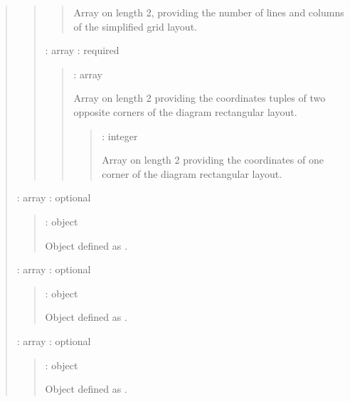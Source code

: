 \documentclass[letterpaper,10pt, openany,english]{sphinxmanual}
\begin{document}
\begin{quote}
\begin{quote}
\begin{quote}
Array on length 2, providing the number of lines and columns of the simplified grid layout.
\end{quote}

 : array : required
\begin{quote}

 : array

Array on length 2 providing the coordinates tuples of two opposite corners of the diagram rectangular layout.
\begin{quote}

 : integer

Array on length 2 providing the coordinates of one corner of the diagram rectangular layout.
\end{quote}
\end{quote}
\end{quote}

 : array : optional
\begin{quote}

 : object

Object defined as {\hyperref[\detokenize{requirements:elementary-object}]{}}.
\end{quote}

 : array : optional
\begin{quote}

 : object

Object defined as {\hyperref[\detokenize{requirements:elementary-object}]{}}.
\end{quote}

 : array : optional
\begin{quote}

 : object

Object defined as {\hyperref[\detokenize{requirements:elementary-object}]{}}.
\end{quote}
\end{quote}
\label{\detokenize{requirements:elementary-object}}
\end{document}
